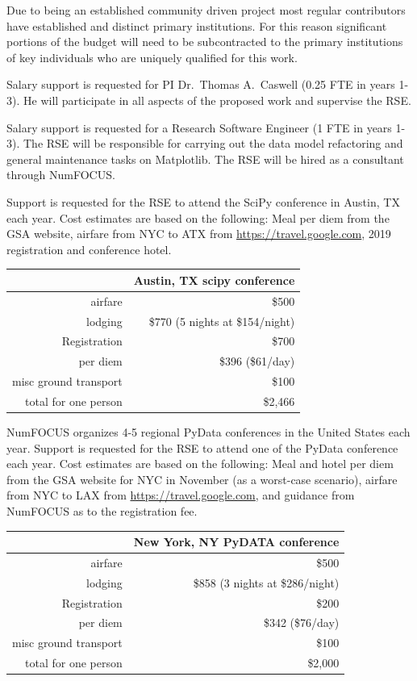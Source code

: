 \documentclass[12pt]{article}
\numberwithin{page}{section}
\begin{document}
Due to being an established community driven project most regular
contributors have established and distinct primary institutions.  For
this reason significant portions of the budget will need to be
subcontracted to the primary institutions of key individuals who are
uniquely qualified for this work.

Salary support is requested for PI Dr.\ Thomas A.\ Caswell (0.25 FTE in
years 1-3).  He will participate in all aspects of the proposed work
and supervise the RSE.

Salary support is requested for a Research Software Engineer (1 FTE in
years 1-3).  The RSE will be responsible for carrying out the data
model refactoring and general maintenance tasks on Matplotlib.  The
RSE will be hired as a consultant through NumFOCUS.

Support is requested for the RSE to attend the SciPy conference in
Austin, TX each year.  Cost estimates are based on the following: Meal
per diem from the GSA website, airfare from NYC to ATX from
\url{https://travel.google.com}, 2019 registration and conference hotel.

\begin{tabular}{|r|r|}
  \hline
  & Austin, TX scipy conference\\\hline
  airfare & \$500 \\\hline
  lodging & \$770 (5 nights at \$154/night) \\\hline
  Registration & \$700 \\\hline
  per diem & \$396 (\$61/day) \\\hline
  misc ground transport & \$100 \\\hline\hline
  total for one person & \$2,466    \\\hline
\end{tabular}


NumFOCUS organizes 4-5 regional PyData conferences in the United
States each year.  Support is requested for the RSE to attend one of
the PyData conference each year.  Cost estimates are based on the
following: Meal and hotel per diem from the GSA website for NYC in
November (as a worst-case scenario), airfare from NYC to LAX from
\url{https://travel.google.com}, and guidance from NumFOCUS as to the
registration fee.


\begin{tabular}{|r|r|}
  \hline
  & New York, NY  PyDATA conference\\\hline
  airfare & \$500     \\\hline
  lodging & \$858 (3 nights at \$286/night)     \\\hline
  Registration & \$200     \\\hline
  per diem & \$342 (\$76/day)     \\\hline
  misc ground transport & \$100     \\\hline\hline
  total for one person & \$2,000     \\\hline
\end{tabular}
\end{document}
